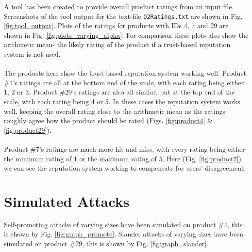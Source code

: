 \documentclass{article}
\begin{document}
A tool has been created to provide overall product ratings from an input file. Screenshots of the tool output for the text-file \texttt{Q2Ratings.txt} are shown in Fig. \ref{fig:tool_output}.
Plots of the ratings for products with IDs 4, 7 and 29 are shown in Fig. \ref{fig:plots_varying_alpha}. For comparison these plots also show the arithmetic mean- the likely rating of the product if a trust-based reputation system is not used.
\\\\
The products here show the trust-based reputation system working well.
Product \#4's ratings are all at the bottom end of the scale, with each rating being either 1, 2 or 3. 
Product \#29's ratings are also all similar, but at the top end of the scale, with each rating being 4 or 5.
In these cases the reputation system works well, keeping the overall rating close to the arithmetic mean as the ratings roughly agree how the product should be rated (Figs. \ref{fig:product4} \& \ref{fig:product29}).
\\\\
Product \#7's ratings are much more hit and miss, with every rating being either the minimum rating of 1 or the maximum rating of 5.
Here (Fig. \ref{fig:product7}) we can see the reputation system working to compensate for users' disagreement.

\section{Simulated Attacks} %
Self-promoting attacks of varying sizes have been simulated on product \#4, this is shown by Fig. \ref{fig:graph_promote}.
Slander attacks of varying sizes have been simulated on product \#29, this is shown by Fig. \ref{fig:graph_slander}.
\end{document}
